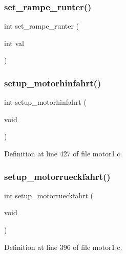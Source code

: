 \subsubsection{set\+\_\+rampe\+\_\+runter()}
{\footnotesize\ttfamily int set\+\_\+rampe\+\_\+runter (\begin{DoxyParamCaption}\item[{int}]{val }\end{DoxyParamCaption})}

\mbox{\label{_motor1_8h_ada4960474e4d8468890ef4bf8bb124d1}} 
\subsubsection{setup\+\_\+motorhinfahrt()}
{\footnotesize\ttfamily int setup\+\_\+motorhinfahrt (\begin{DoxyParamCaption}\item[{void}]{ }\end{DoxyParamCaption})}



Definition at line 427 of file motor1.\+c.

\mbox{\label{_motor1_8h_a6fcdd3a1db9fc997a3d2130d6ceaef8c}} 
\subsubsection{setup\+\_\+motorrueckfahrt()}
{\footnotesize\ttfamily int setup\+\_\+motorrueckfahrt (\begin{DoxyParamCaption}\item[{void}]{ }\end{DoxyParamCaption})}



Definition at line 396 of file motor1.\+c.

